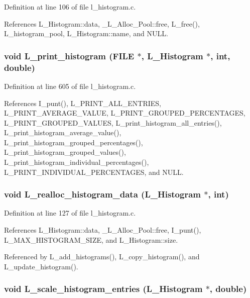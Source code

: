 Definition at line 106 of file l\_\-histogram.c.

References L\_\-Histogram::data, \_\-L\_\-Alloc\_\-Pool::free, L\_\-free(), L\_\-histogram\_\-pool, L\_\-Histogram::name, and NULL.
\subsubsection{\setlength{\rightskip}{0pt plus 5cm}void L\_\-print\_\-histogram (FILE $\ast$, \bf{L\_\-Histogram} $\ast$, int, double)}\label{l__histogram_8h_834b9cbd38b41f5ff7b921dfce22ea17}




Definition at line 605 of file l\_\-histogram.c.

References I\_\-punt(), L\_\-PRINT\_\-ALL\_\-ENTRIES, L\_\-PRINT\_\-AVERAGE\_\-VALUE, L\_\-PRINT\_\-GROUPED\_\-PERCENTAGES, L\_\-PRINT\_\-GROUPED\_\-VALUES, L\_\-print\_\-histogram\_\-all\_\-entries(), L\_\-print\_\-histogram\_\-average\_\-value(), L\_\-print\_\-histogram\_\-grouped\_\-percentages(), L\_\-print\_\-histogram\_\-grouped\_\-values(), L\_\-print\_\-histogram\_\-individual\_\-percentages(), L\_\-PRINT\_\-INDIVIDUAL\_\-PERCENTAGES, and NULL.
\subsubsection{\setlength{\rightskip}{0pt plus 5cm}void L\_\-realloc\_\-histogram\_\-data (\bf{L\_\-Histogram} $\ast$, int)}\label{l__histogram_8h_a5db6150e9c9c144482465eb95f47137}




Definition at line 127 of file l\_\-histogram.c.

References L\_\-Histogram::data, \_\-L\_\-Alloc\_\-Pool::free, I\_\-punt(), L\_\-MAX\_\-HISTOGRAM\_\-SIZE, and L\_\-Histogram::size.

Referenced by L\_\-add\_\-histograms(), L\_\-copy\_\-histogram(), and L\_\-update\_\-histogram().
\subsubsection{\setlength{\rightskip}{0pt plus 5cm}void L\_\-scale\_\-histogram\_\-entries (\bf{L\_\-Histogram} $\ast$, double)}\label{l__histogram_8h_056e7bca0012edf0d7be56027b6514b7}




